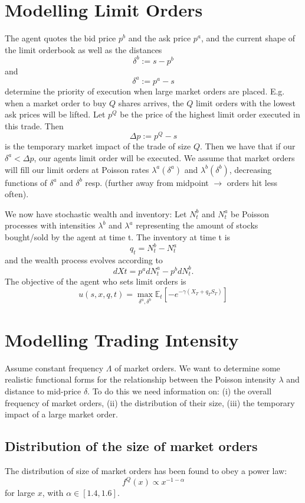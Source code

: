 \section{Modelling Limit Orders}
The agent quotes the bid price $p^b$ and the ask price $p^a$, and the current shape of the limit orderbook as well as the distances 
$$\delta^b:=s-p^b$$
and 
$$\delta^a:=p^a-s$$ 
determine the priority of execution when large market orders are placed. 
E.g. when a market order to buy $Q$ shares arrives, the $Q$ limit orders with the lowest ask prices will be lifted. 
Let $p^Q$ be the price of the highest limit order executed in this trade. Then 
$$\Delta p:=p^Q-s$$ 
is the temporary market impact of the trade of size $Q.$ 
Then we have that if our $\delta^a < \Delta p$, our agents limit order will be executed. We assume that market orders will fill our limit orders at Poisson rates $\lambda^a(\delta^a)$ and $\lambda^b(\delta^b)$, decreasing functions of $\delta^a$ and $\delta^b$ resp. 
(further away from midpoint $\rightarrow$ orders hit less often).

We now have stochastic wealth and inventory: Let $N^b_t$ and $N^a_t$ be Poisson processes with intensities $\lambda^b$ and $\lambda^a$ representing the amount of stocks bought/sold by the agent at time t. The inventory at time t is 
$$q_t=N^b_t-N^a_t$$ and the wealth process evolves according to
$$dXt=p^adN^a_t-p^bdN^b_t.$$
The objective of the agent who sets limit orders is 
$$u(s,x,q,t)=\max\limits_{\delta^a,\delta^b}\mathbb{E}_t\left[-e^{-\gamma(X_T+q_TS_T)}\right]$$

\section{Modelling Trading Intensity}
Assume constant frequency $\Lambda$ of market orders. We want to determine some realistic functional forms for the relationship between the Poisson intensity $\lambda$ and distance to mid-price $\delta$. 
To do this we need information on: (i) the overall frequency of market orders, (ii) the distribution of their size, (iii) the temporary impact of a large market order. 
\subsection*{Distribution of the size of market orders}
The distribution of size of market orders has been found to obey a power law:
\begin{equation}\label{eq:2}
    f^{Q}(x)\propto x^{-1-\alpha}
\end{equation}
for large $x$, with $\alpha\in[1.4,1.6].$

